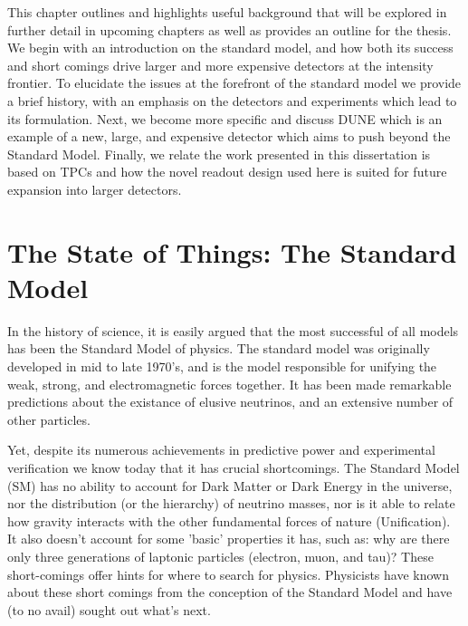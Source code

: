 This chapter outlines and highlights useful background that will be explored in further detail in upcoming chapters as well as provides an outline for the thesis.
We begin with an introduction on the standard model, and how both its success and short comings drive larger and more expensive detectors at the intensity frontier.
To elucidate the issues at the forefront of the standard model we provide a brief history, with an emphasis on the detectors and experiments which lead to its formulation.
Next, we become more specific and discuss DUNE which is an example of a new, large, and expensive detector which aims to push beyond the Standard Model.
Finally, we relate the work presented in this dissertation is based on TPCs and how the novel readout design used here is suited for future expansion into larger detectors.

\section{The State of Things: The Standard Model}

In the history of science, it is easily argued that the most successful of all models has been the Standard Model of physics.
The standard model was originally developed in mid to late 1970's, and is the model responsible for unifying the weak, strong, and electromagnetic forces together.
It has been made remarkable predictions about the existance of elusive neutrinos, and an extensive number of other particles.


Yet, despite its numerous achievements in predictive power and experimental verification we know today that it has crucial shortcomings. 
The Standard Model (SM) has no ability to account for Dark Matter or Dark Energy in the universe, nor the distribution (or the hierarchy) of neutrino masses, nor is it able to relate how gravity interacts with the other fundamental forces of nature (Unification).
It also doesn't account for some 'basic' properties it has, such as: why are there only three generations of laptonic particles (electron, muon, and tau)?
These short-comings offer hints for where to search for physics.
Physicists have known about these short comings from the conception of the Standard Model and have (to no avail) sought out what's next.

